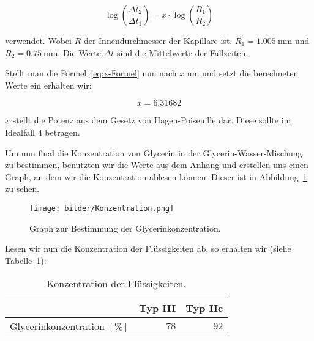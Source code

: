             \begin{equation}
                \log\left(\frac{\Delta t_{2}}{\Delta t_{1}}\right) = x \cdot \log\left(\frac{R_{1}}{R_{2}}\right)
                \label{eq:x-Formel}
            \end{equation}

            verwendet. Wobei $R$ der Innendurchmesser der Kapillare ist. $R_{1} = 1.005\ \mathrm{mm}$ und $R_{2} = 0.75\ \mathrm{mm}$. Die Werte $\Delta t$ sind die Mittelwerte der Fallzeiten.

            Stellt man die Formel~\ref{eq:x-Formel} nun nach $x$ um und setzt die berechneten Werte ein erhalten wir:

            $$x = 6.31682$$

            $x$ stellt die Potenz aus dem Gesetz von Hagen-Poiseuille dar. Diese sollte im Idealfall $4$ betragen.

            Um nun final die Konzentration von Glycerin in der Glycerin-Wasser-Mischung zu bestimmen, benutzten wir die Werte aus dem Anhang und erstellen uns einen Graph, an dem wir die Konzentration ablesen können. Dieser ist in Abbildung~\ref{fig:GraphKonzentration} zu sehen.

            \begin{figure}[H]
                \centering
                \texttt{[image: bilder/Konzentration.png]}
                \caption{Graph zur Bestimmung der Glycerinkonzentration.}
                \label{fig:GraphKonzentration}
            \end{figure}

            Lesen wir nun die Konzentration der Flüssigkeiten ab, so erhalten wir (siehe Tabelle~\ref{tab:Konzentration}):

            \begin{table}[H]
                \centering
                \caption{Konzentration der Flüssigkeiten.}
                \vspace*{.5em}
                \begin{tabular}{|l||r|r|}
                    \hline
                    & Typ III & Typ IIc\\
                    \hline\hline
                    Glycerinkonzentration $[\mathrm{\%}]$ & $78$ & $92$\\
                    \hline
                \end{tabular}
                \label{tab:Konzentration}
            \end{table}

